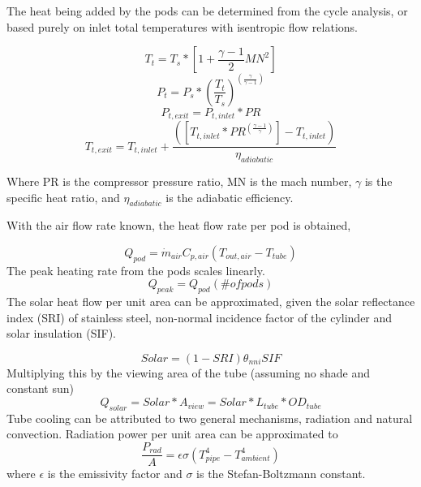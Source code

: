 \documentclass[heading.tex]{subfiles}
\begin{document}
The heat being added by the pods can be determined from the cycle analysis, or based purely on inlet total temperatures with isentropic
flow relations.

\begin{equation*}
T_{t} = T_{s} * [1 + \frac{\gamma -1}{2} MN^2]
\end{equation*}
\begin{equation*}
P_{t} = P_{s} * (\frac{ T_{t}}{T_{s}})^(\frac{\gamma}{\gamma -1})
\end{equation*}
\begin{equation*}
P_{t,exit} = P_{t,inlet} * PR
\end{equation*}
\begin{equation*}
T_{t,exit} = T_{t,inlet} + \frac{([T_{t,inlet}*PR^{(\frac{\gamma-1}{\gamma})}] - T_{t,inlet})}  {{\eta}_{adiabatic}}
\end{equation*}

Where PR is the compressor pressure ratio, MN is the mach number,  $\gamma$ is the specific heat ratio, and  ${\eta}_{adiabatic}$ is the
adiabatic efficiency.

With the air flow rate known, the heat flow rate per pod is obtained,

\begin{equation*}
{Q}_{pod}= \dot{m}_{air} C_{p,air} (T_{out, air} - T_{tube})
\end{equation*}
The peak heating rate from the pods scales linearly.
\begin{equation*}
{Q}_{peak}= Q_{pod} (\# ofpods)
\end{equation*}
The solar heat flow per unit area can be approximated, given the solar reflectance index (SRI) of stainless steel, non-normal incidence factor
of the cylinder and solar insulation (SIF).


\begin{equation*}
Solar = (1-SRI) {\theta}_{nni} SIF
\end{equation*}
Multiplying this by the viewing area of the tube (assuming no shade and constant sun)
\begin{equation*}
Q_{solar} = Solar * A_{view} = Solar * L_{tube} * OD_{tube}
\end{equation*}
Tube cooling can be attributed to two general mechanisms, radiation and natural convection. Radiation power per unit area can be
approximated to
\begin{equation*}
\frac{P_{rad}}{A} = \epsilon \sigma (T_{pipe}^4 - T_{ambient}^4)
\end{equation*}
where  $\epsilon$ is the emissivity factor and  $\sigma$ is the Stefan-Boltzmann constant.
\end{document}
